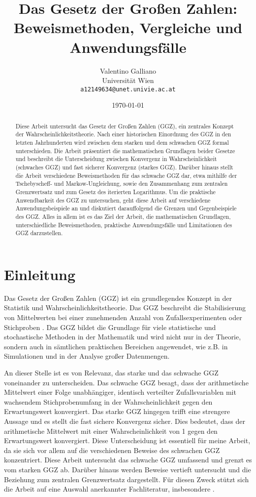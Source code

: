 \documentclass[12pt,a4paper]{article}
\title{Das Gesetz der Großen Zahlen: Beweismethoden, Vergleiche und Anwendungsfälle}
\author{Valentino Galliano \\
Universität Wien \\
\texttt{a12149634@unet.univie.ac.at}}
\date{\today}
\begin{document}
\maketitle

\newpage

\begin{abstract}
    Diese Arbeit untersucht das Gesetz der Großen Zahlen (GGZ), ein zentrales Konzept der Wahrscheinlichkeitstheorie.
    Nach einer historischen Einordnung des GGZ in den letzten Jahrhunderten wird zwischen dem starken und dem schwachen GGZ formal unterschieden.
    Die Arbeit präsentiert die mathematischen Grundlagen beider Gesetze und beschreibt die Unterscheidung zwischen Konvergenz in Wahrscheinlichkeit (schwaches GGZ) und fast sicherer Konvergenz (starkes GGZ).
    Darüber hinaus stellt die Arbeit verschiedene Beweismethoden für das schwache GGZ dar, etwa mithilfe der Tschebyscheff- und Markow-Ungleichung, sowie den Zusammenhang zum zentralen Grenzwertsatz und zum Gesetz des iterierten Logarithmus.
    Um die praktische Anwendbarkeit des GGZ zu untersuchen, geht diese Arbeit auf verschiedene Anwendungsbeispiele an und diskutiert darauffolgend die Grenzen und Gegenbeispiele des GGZ.
    Alles in allem ist es das Ziel der Arbeit, die mathematischen Grundlagen, unterschiedliche Beweismethoden, praktische Anwendungsfälle und Limitationen des GGZ darzustellen.
\end{abstract}

\section{Einleitung}
\label{sec:einleitung}
Das Gesetz der Großen Zahlen (GGZ) ist ein grundlegendes Konzept in der Statistik und Wahrscheinlichkeitstheorie.
Das GGZ beschreibt die Stabilisierung von Mittelwerten bei einer zunehmenden Anzahl von Zufallsexperimenten oder Stichproben \citep{degroot2021}.
Das GGZ bildet die Grundlage für viele statistische und stochastische Methoden in der Mathematik und wird nicht nur in der Theorie, sondern auch in sämtlichen praktischen Bereichen angewendet, wie z.B. in Simulationen und in der Analyse großer Datenmengen.


An dieser Stelle ist es von Relevanz, das starke und das schwache GGZ voneinander zu unterscheiden.
Das schwache GGZ besagt, dass der arithmetische Mittelwert einer Folge unabhängiger, identisch verteilter Zufallsvariablen mit wachsendem Stichprobenumfang in der Wahrscheinlichkeit gegen den Erwartungswert konvergiert.
Das starke GGZ hingegen trifft eine strengere Aussage und es stellt die fast sichere Konvergenz sicher.
Dies bedeutet, dass der arithmetische Mittelwert mit einer Wahrscheinlichkeit von 1 gegen den Erwartungswert konvergiert.
Diese Unterscheidung ist essentiell für meine Arbeit, da sie sich vor allem auf die verschiedenen Beweise des schwachen GGZ konzentriert.
Diese Arbeit untersucht das schwache GGZ umfassend und grenzt es vom starken GGZ ab.
Darüber hinaus werden Beweise vertieft untersucht und die Beziehung zum zentralen Grenzwertsatz dargestellt.
Für diesen Zweck stützt sich die Arbeit auf eine Auswahl anerkannter Fachliteratur, insbesondere \citet{degroot2021, blitzstein2019, stoyanov2013}.
\end{document}
